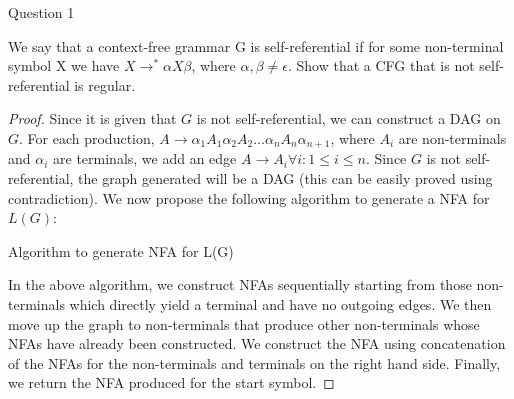 \begin{solution}{Question 1}\label{ques:1}
    \begin{question}
    We say that a context-free grammar G is self-referential if for some non-terminal symbol X we have $X\longrightarrow^* \alpha X \beta$, where $\alpha,\beta \neq \epsilon$. Show that a CFG that is not self-referential is regular.
    \end{question}
    \tcblower{}
    \begin{proof}
      Since it is given that $G$ is not self-referential, we can construct a DAG on $G$. For each production, $A \to \alpha_1 A_1 \alpha_2 A_2 \ldots \alpha_n A_n \alpha_{n+1}$, where $A_i$ are non-terminals and $\alpha_i$ are terminals, we add an edge $A \to A_i \forall i: 1 \leq i \leq n$. Since $G$ is not self-referential, the graph generated will be a DAG (this can be easily proved using contradiction). We now propose the following algorithm to generate a NFA for $L(G)$:
      \begin{algorithm}[H]
        \caption{Algorithm to generate NFA for L(G)}
        \begin{algorithmic}[1]
             
            \EndWhile{}
             
          \EndProcedure{}
        \end{algorithmic}
      \end{algorithm}
      In the above algorithm, we construct NFAs sequentially starting from those non-terminals which directly yield a terminal and have no outgoing edges. We then move up the graph to non-terminals that produce other non-terminals whose NFAs have already been constructed. We construct the NFA using concatenation of the NFAs for the non-terminals and terminals on the right hand side. Finally, we return the NFA produced for the start symbol.
    \end{proof}
\end{solution}
